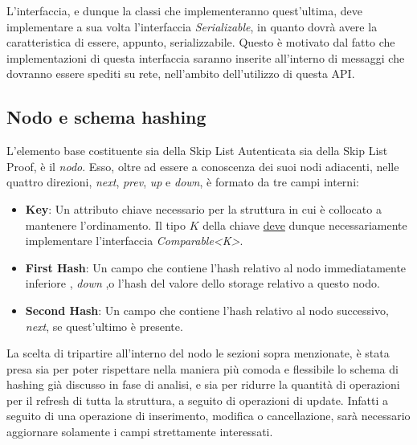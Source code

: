 		L'interfaccia, e dunque la classi che implementeranno quest'ultima, deve implementare a sua volta l'interfaccia \textit{Serializable}, in quanto dovrà avere la caratteristica di essere, appunto, serializzabile. Questo è motivato dal fatto che implementazioni di questa interfaccia saranno inserite all'interno di messaggi che dovranno essere spediti su rete, nell'ambito dell'utilizzo di questa API.
	
	\subsection{Nodo e schema hashing}
	
	
	L'elemento base costituente sia della Skip List Autenticata sia della Skip List Proof, è il \textit{nodo}. Esso, oltre ad essere a conoscenza dei suoi nodi adiacenti, nelle quattro direzioni, \textit{next}, \textit{prev},  \textit{up} e \textit{down}, è formato da tre campi interni:
	\begin{itemize}
		\item \textbf{Key}: Un attributo chiave necessario per la struttura in cui è collocato a mantenere l'ordinamento. Il tipo $ K $ della chiave \underline{deve} dunque necessariamente implementare l'interfaccia \textit{Comparable<K>}.
		\item \textbf{First Hash}: Un campo che contiene l'hash relativo al nodo immediatamente inferiore , \textit{down} ,o l'hash del valore dello storage relativo a questo nodo.
		\item \textbf{Second Hash}: Un campo che contiene l'hash relativo al nodo successivo,  \textit{next}, se quest'ultimo è presente.
	\end{itemize}

	La scelta di tripartire all'interno del nodo le sezioni sopra menzionate, è stata presa sia per poter rispettare nella maniera più comoda e flessibile lo schema di hashing già discusso in fase di analisi, e sia per ridurre la quantità di operazioni per il refresh di tutta la struttura, a seguito di operazioni di update. Infatti a seguito di una operazione di inserimento, modifica o cancellazione, sarà necessario aggiornare solamente i campi strettamente interessati.
	
